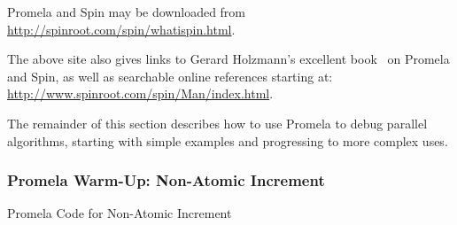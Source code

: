 Promela and Spin may be downloaded from
\url{http://spinroot.com/spin/whatispin.html}.

The above site also gives links to Gerard Holzmann's excellent
book~\cite{Holzmann03a} on Promela and Spin,
as well as searchable online references starting at:
\url{http://www.spinroot.com/spin/Man/index.html}.

The remainder of this section describes how to use Promela to debug
parallel algorithms, starting with simple examples and progressing to
more complex uses.

\subsubsection{Promela Warm-Up: Non-Atomic Increment}
\label{sec:formal:Promela Warm-Up: Non-Atomic Increment}

\begin{listing}[tbp]

\caption{Promela Code for Non-Atomic Increment}
\label{lst:analysis:Promela Code for Non-Atomic Increment}
\end{listing}

